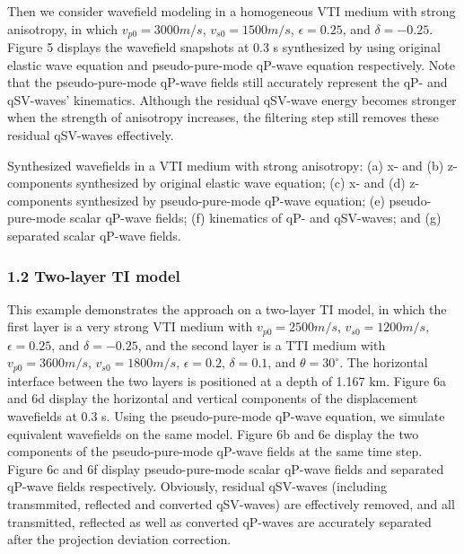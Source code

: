 Then we consider wavefield modeling in a homogeneous VTI medium with strong anisotropy,
 in which $v_{p0}=3000 m/s$, $v_{s0}=1500 m/s$, $\epsilon=0.25$, and $\delta=-0.25$.
 Figure 5 displays the wavefield snapshots at 0.3 s synthesized by using original elastic wave equation
and pseudo-pure-mode qP-wave equation respectively. Note that the pseudo-pure-mode qP-wave fields still accurately
represent the qP- and qSV-waves' kinematics. Although the residual qSV-wave energy becomes stronger when
the strength of anisotropy increases, the filtering step still removes these residual qSV-waves effectively.

{
Synthesized wavefields in a VTI medium with strong anisotropy: (a) x- and
(b) z-components synthesized by original elastic wave equation; (c) x- and
 (d) z-components synthesized by pseudo-pure-mode qP-wave equation; (e) pseudo-pure-mode scalar qP-wave fields; 
(f) kinematics of qP- and qSV-waves; and (g) separated scalar qP-wave fields.
}

\subsubsection{1.2 Two-layer TI model}

This example demonstrates the approach on a two-layer TI model, in which the first layer is a very
strong VTI medium with $v_{p0}=2500 m/s$, $v_{s0}=1200 m/s$, $\epsilon=0.25$, and $\delta=-0.25$, 
and the second layer is a TTI medium with $v_{p0}=3600 m/s$, $v_{s0}=1800 m/s$, 
$\epsilon=0.2$, $\delta=0.1$, and $\theta=30^{\circ}$. The horizontal interface between the two layers 
is positioned at a depth of 1.167 km.
 Figure 6a and 6d display the horizontal and vertical components of the displacement wavefields at 0.3 s.
 Using the pseudo-pure-mode qP-wave equation, we simulate equivalent wavefields on the same model.
Figure 6b and 6e display the two components of the pseudo-pure-mode qP-wave fields at the same time step.
Figure 6c and 6f display pseudo-pure-mode scalar qP-wave fields and separated qP-wave fields respectively.
Obviously, residual qSV-waves (including transmmited, reflected 
and converted qSV-waves) are effectively removed, and all transmitted, reflected as well as converted
qP-waves are accurately separated after the projection deviation correction.

